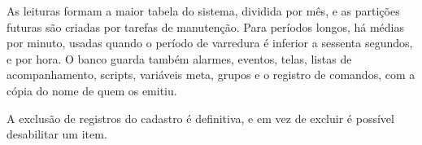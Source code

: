 \par As leituras formam a maior tabela do sistema, dividida por mês, e as partições futuras são criadas por tarefas de manutenção. Para períodos longos, há médias por minuto, usadas quando o período de varredura é inferior a sessenta segundos, e por hora. O banco guarda também alarmes, eventos, telas, listas de acompanhamento, scripts, variáveis meta, grupos e o registro de comandos, com a cópia do nome de quem os emitiu.

\par A exclusão de registros do cadastro é definitiva, e em vez de excluir é possível desabilitar um item.

